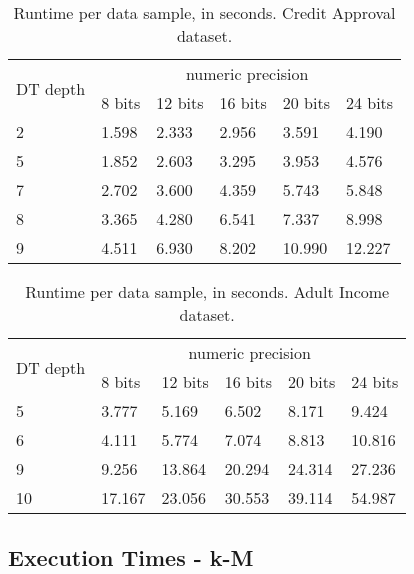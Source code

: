 \begin{table}[H]
\centering
\caption{Runtime per data sample, in seconds. Credit Approval dataset.}
\label{table:runtimeDTCA}
\begin{tabular}{|l|l|l|l|l|l|}
\hline
\multirow{2}{*}{DT depth} & \multicolumn{5}{c|}{numeric precision}         \\ \cline{2-6} 
                          & 8 bits & 12 bits & 16 bits & 20 bits & 24 bits \\ \hline
2                         & 1.598  & 2.333   & 2.956   & 3.591   & 4.190   \\ \hline
5                         & 1.852  & 2.603   & 3.295   & 3.953   & 4.576   \\ \hline
7                         & 2.702  & 3.600   & 4.359   & 5.743   & 5.848   \\ \hline
8                         & 3.365  & 4.280   & 6.541   & 7.337   & 8.998   \\ \hline
9                         & 4.511  & 6.930   & 8.202   & 10.990  & 12.227  \\ \hline
\end{tabular}
\end{table}


\begin{table}[H]
\centering
\caption{Runtime per data sample, in seconds. Adult Income dataset.}
\label{table:runtimeDTAI}
\begin{tabular}{|l|l|l|l|l|l|}
\hline
\multirow{2}{*}{DT depth} & \multicolumn{5}{c|}{numeric precision}         \\ \cline{2-6} 
                          & 8 bits & 12 bits & 16 bits & 20 bits & 24 bits \\ \hline
5                         & 3.777  & 5.169   & 6.502   & 8.171   & 9.424   \\ \hline
6                         & 4.111  & 5.774   & 7.074   & 8.813   & 10.816  \\ \hline
9                         & 9.256  & 13.864  & 20.294  & 24.314  & 27.236  \\ \hline
10                        & 17.167 & 23.056  & 30.553  & 39.114  & 54.987  \\ \hline
\end{tabular}
\end{table}







\subsection{Execution Times - \acl{k-M}}


